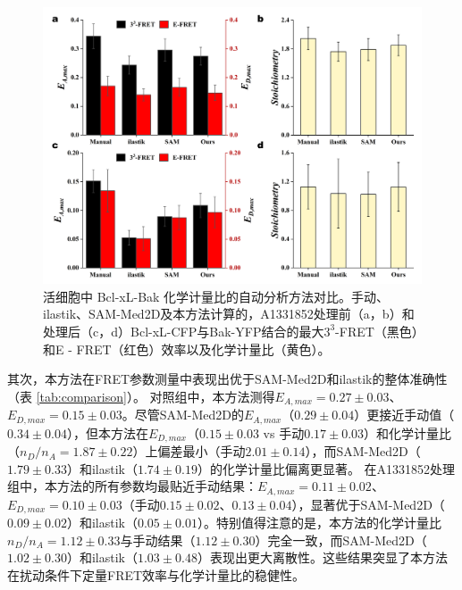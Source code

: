 \begin{figure}[!htb]
  \centering
  \includegraphics[width=1\linewidth]{../figures/4/4_方法对比.png}
  \caption[活细胞中 Bcl-xL-Bak 化学计量比的自动分析方法对比]{活细胞中 Bcl-xL-Bak 化学计量比的自动分析方法对比。手动、ilastik、SAM-Med2D及本方法计算的，A1331852处理前（a，b）和处理后（c，d）Bcl-xL-CFP与Bak-YFP结合的最大$3^3$-FRET（黑色）和E - FRET（红色）效率以及化学计量比（黄色）。}\label{fig3}
\end{figure}

其次，本方法在FRET参数测量中表现出优于SAM-Med2D和ilastik的整体准确性（表 \ref{tab:comparison}）。
对照组中，本方法测得$E_{A,{max}}=0.27\pm0.03$、$E_{D,{max}}=0.15\pm0.03$。尽管SAM-Med2D的$E_{A,{max}}$（$0.29\pm0.04$）更接近手动值（$0.34\pm0.04$），但本方法在$E_{D,{max}}$（$0.15\pm0.03$ vs 手动$0.17\pm0.03$）和化学计量比（$n_D/n_A=1.87\pm0.22$）上偏差最小（手动$2.01\pm0.14$），而SAM-Med2D（$1.79\pm0.33$）和ilastik（$1.74\pm0.19$）的化学计量比偏离更显著。
在A1331852处理组中，本方法的所有参数均最贴近手动结果：$E_{A,{max}}=0.11\pm0.02$、$E_{D,{max}}=0.10\pm0.03$（手动$0.15\pm0.02$、$0.13\pm0.04$），显著优于SAM-Med2D（$0.09\pm0.02$）和ilastik（$0.05\pm0.01$）。特别值得注意的是，本方法的化学计量比$n_D/n_A=1.12\pm0.33$与手动结果（$1.12\pm0.30$）完全一致，而SAM-Med2D（$1.02\pm0.30$）和ilastik（$1.03\pm0.48$）表现出更大离散性。这些结果突显了本方法在扰动条件下定量FRET效率与化学计量比的稳健性。

